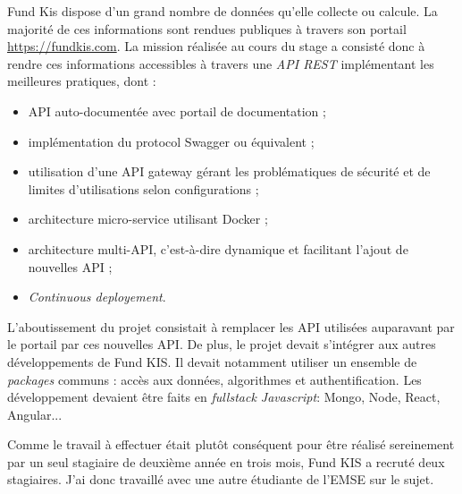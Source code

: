 Fund Kis dispose d'un grand nombre de données qu'elle collecte ou calcule. La majorité de ces informations sont rendues publiques à travers son portail \url{https://fundkis.com}. La mission réalisée au cours du stage a consisté donc à rendre ces informations accessibles à travers une \textit{API REST} implémentant les meilleures pratiques, dont :
\begin{itemize}
  \item API auto-documentée avec portail de documentation ;
  \item implémentation du protocol Swagger ou équivalent ;
  \item utilisation d'une API gateway gérant les problématiques de sécurité et de limites d'utilisations selon configurations ;
  \item architecture micro-service utilisant Docker ;
  \item architecture multi-API, c'est-à-dire dynamique et facilitant l'ajout de nouvelles API ;
  \item \textit{Continuous deployement}.
\end{itemize}

L'aboutissement du projet consistait à remplacer les API utilisées auparavant par le portail par ces nouvelles API. De plus, le projet devait s'intégrer aux autres développements de Fund KIS. Il devait notamment utiliser un ensemble de \textit{packages} communs : accès aux données, algorithmes et authentification. Les développement devaient être faits en \textit{fullstack Javascript}: Mongo, Node, React, Angular...

Comme le travail à effectuer était plutôt conséquent pour être réalisé sereinement par un seul stagiaire de deuxième année en trois mois, Fund KIS a recruté deux stagiaires. J'ai donc travaillé avec une autre étudiante de l'EMSE sur le sujet.
